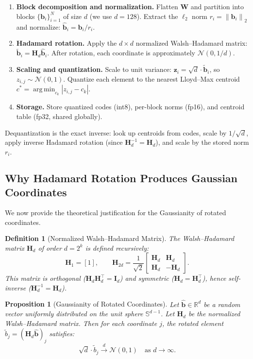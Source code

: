 \documentclass[10pt,twocolumn]{article}
\newtheorem{proposition}[theorem]{Proposition}
\newtheorem{definition}[theorem]{Definition}
\newcommand{\R}{\mathbb{R}}
\newcommand{\bH}{\mathbf{H}}
\newcommand{\bW}{\mathbf{W}}
\newcommand{\bb}{\mathbf{b}}
\newcommand{\bz}{\mathbf{z}}
\newcommand{\norm}[1]{\left\| #1 \right\|}
\DeclareMathOperator*{\argmin}{arg\,min}
\begin{document}
\begin{enumerate}[leftmargin=*,itemsep=2pt]
  \item \textbf{Block decomposition and normalization.} Flatten $\bW$ and partition into blocks $\{\bb_i\}_{i=1}^{N}$ of size $d$ (we use $d = 128$). Extract the $\ell_2$ norm $r_i = \norm{\bb_i}_2$ and normalize: $\hat{\bb}_i = \bb_i / r_i$.
  \item \textbf{Hadamard rotation.} Apply the $d \times d$ normalized Walsh--Hadamard matrix: $\tilde{\bb}_i = \bH_d \hat{\bb}_i$. After rotation, each coordinate is approximately $\mathcal{N}(0, 1/d)$.
  \item \textbf{Scaling and quantization.} Scale to unit variance: $\bz_i = \sqrt{d} \cdot \tilde{\bb}_i$, so $z_{i,j} \sim \mathcal{N}(0, 1)$. Quantize each element to the nearest Lloyd--Max centroid $c^* = \argmin_{c_k} |z_{i,j} - c_k|$.
  \item \textbf{Storage.} Store quantized codes (int8), per-block norms (fp16), and centroid table (fp32, shared globally).
\end{enumerate}

Dequantization is the exact inverse: look up centroids from codes, scale by $1/\sqrt{d}$, apply inverse Hadamard rotation (since $\bH_d^{-1} = \bH_d$), and scale by the stored norm $r_i$.

\subsection{Why Hadamard Rotation Produces Gaussian Coordinates}
\label{sec:gaussian}

We now provide the theoretical justification for the Gaussianity of rotated coordinates.

\begin{definition}[Normalized Walsh--Hadamard Matrix]
The Walsh--Hadamard matrix $\bH_d$ of order $d = 2^k$ is defined recursively:
\begin{equation}
  \bH_1 = [1], \qquad
  \bH_{2d} = \frac{1}{\sqrt{2}}
  \begin{bmatrix}
    \bH_d & \bH_d \\
    \bH_d & -\bH_d
  \end{bmatrix}.
  \label{eq:hadamard}
\end{equation}
This matrix is orthogonal ($\bH_d \bH_d^\top = \mathbf{I}_d$) and symmetric ($\bH_d = \bH_d^\top$), hence self-inverse ($\bH_d^{-1} = \bH_d$).
\end{definition}

\begin{proposition}[Gaussianity of Rotated Coordinates]
\label{prop:gaussian}
Let $\hat{\bb} \in \R^d$ be a random vector uniformly distributed on the unit sphere $\mathbb{S}^{d-1}$. Let $\bH_d$ be the normalized Walsh--Hadamard matrix. Then for each coordinate $j$, the rotated element $\tilde{b}_j = (\bH_d \hat{\bb})_j$ satisfies:
\begin{equation}
  \sqrt{d} \cdot \tilde{b}_j \xrightarrow{d} \mathcal{N}(0, 1) \quad \text{as } d \to \infty.
  \label{eq:clt}
\end{equation}
\end{proposition}
\end{document}
